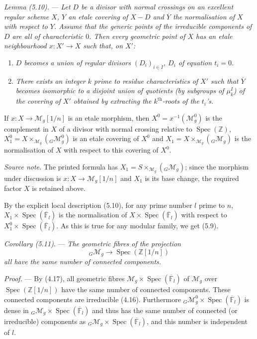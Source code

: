 \documentclass[10pt]{article}
\newcommand{\Spec}{\operatorname{Spec}}
\begin{document}
\medskip
\noindent\emph{Lemma (5.10).} --- \emph{Let $D$ be a divisor with normal crossings on an excellent regular scheme $X$, $Y$ an etale covering of $X-D$ and $\overline Y$ the normalisation of $X$ with respect to $Y$. Assume that the generic points of the irreducible components of $D$ are all of characteristic $0$. Then every geometric point of $X$ has an etale neighbourhood $x:X'\to X$ such that, on $X'$:}
\begin{enumerate}[label=(\roman*)]
\item \emph{$D$ becomes a union of regular divisors $(D_i)_{i\in I}$, $D_i$ of equation $t_i=0$.}
\item \emph{There exists an integer $k$ prime to residue characteristics of $X'$ such that $\overline Y$ becomes isomorphic to a disjoint union of quotients (by subgroups of $\mu_k^I$) of the covering of $X'$ obtained by extracting the $k^{\mathrm{th}}$-roots of the $t_i$'s.}
\end{enumerate}

If $x:X\to\mathcal M_g[1/n]$ is an etale morphism, then $X^0=x^{-1}(\mathcal M_g^0)$ is the complement in $X$ of a divisor with normal crossing relative to $\Spec(\mathbb Z)$, $X_1^0=X\times_{\mathcal M_g}({}_G\mathcal M_g^0)$ is an etale covering of $X^0$ and $X_1=X\times_{\mathcal M_g}({}_G\mathcal M_g)$ is the normalisation of $X$ with respect to this covering of $X^0$.

\noindent\textit{Source note.} The printed formula has $X_1=S\times_{\mathcal M_g}({}_G\mathcal M_g)$; since the morphism under discussion is $x:X\to\mathcal M_g[1/n]$ and $X_1$ is its base change, the required factor $X$ is retained above.

By the explicit local description (5.10), for any prime number $l$ prime to $n$, $X_1\times\Spec(\overline{\mathbb F}_l)$ is the normalisation of $X\times\Spec(\overline{\mathbb F}_l)$ with respect to $X_1^0\times\Spec(\overline{\mathbb F}_l)$. As this is true for any modular family, we get (5.9).

\medskip
\noindent\emph{Corollary (5.11).} --- \emph{The geometric fibres of the projection}
\[
{}_G\mathcal M_g\longrightarrow \Spec(\mathbb Z[1/n])
\]
\emph{all have the same number of connected components.}

\noindent\emph{Proof.} --- By (4.17), all geometric fibres $\mathcal M_g\times\Spec(\overline{\mathbb F}_l)$ of $\mathcal M_g$ over $\Spec(\mathbb Z[1/n])$ have the same number of connected components. These connected components are irreducible (4.16). Furthermore ${}_G\mathcal M_g^0\times\Spec(\overline{\mathbb F}_l)$ is dense in ${}_G\mathcal M_g\times\Spec(\overline{\mathbb F}_l)$ and thus has the same number of connected (or irreducible) components as ${}_G\mathcal M_g\times\Spec(\overline{\mathbb F}_l)$, and this number is independent of $l$.
\end{document}

